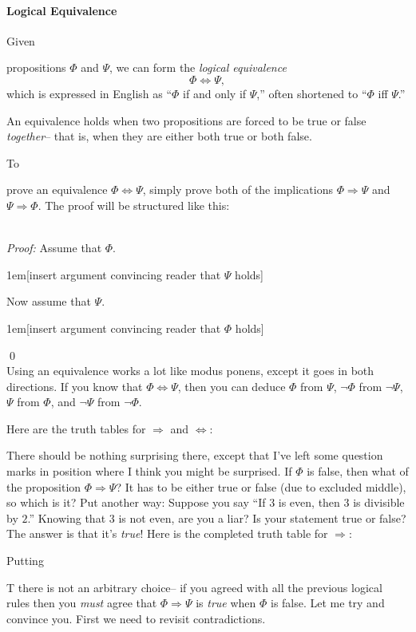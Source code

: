 \documentclass[12pt]{article}
\newcommand{\done}{\\\hspace*{0pt}\hfill$\blacksquare$}
\newcommand{\ARR}{\Rightarrow}
\newcommand{\DARR}{\Leftrightarrow}
\newcounter{rule}
\newcounter{theorem}
\newcommand{\indented}[1]{\begin{adjustwidth}{1em}{}#1\end{adjustwidth}}
\def\thmcolonspace{\hspace{1em}}
\def\proofnewline{\\[0.75em]} %
\def\done{\qed\\[0em]} %
\newcommand{\thmbox}[1]{\fbox{\parbox{\textwidth}{{#1}}}}
\newcommand{\THMMOCK}[2]{\thmbox{\textbf{Theorem:} \thmcolonspace #1} \proofnewline \textit{Proof:} #2\done}
\def\pA{\Phi}
\def\pB{\Psi}
\begin{document}
\paragraph{Logical Equivalence}
\hypertarget{hl:DARR}{Given}  propositions $\pA$ and $\pB$, we can form the \emph{logical equivalence}
$$
\pA\DARR\pB,
$$
which is expressed in English as ``$\pA$ if and only if $\pB$,'' often shortened to ``$\pA$ iff $\pB$.''

An equivalence holds when two propositions are forced to be true or false \emph{together}--
that is, when they are either both true or both false.

\hypertarget{hl:DARRPV}{To} prove an equivalence $\pA\DARR\pB$, simply prove both of the implications $\pA\ARR\pB$ and $\pB\ARR\pA$.
The proof will be structured like this:

\THMMOCK{$\pA\DARR\pB$.}{
Assume that $\pA$.
\indented{[insert argument convincing reader that $\pB$ holds]}
Now assume that $\pB$.
\indented{[insert argument convincing reader that $\pA$ holds]}
}

\hypertarget{hl:DARRUSE}{Using} an equivalence works a lot like modus ponens, except it goes in both directions.
If you know that $\pA\DARR\pB$, then you can deduce $\pA$ from $\pB$, $\neg\pA$ from $\neg\pB$,
$\pB$ from $\pA$, and $\neg\pB$ from $\neg\pA$.



\def\sp{\hspace{1em}}

Here are the truth tables for $\ARR$ and $\DARR$:
\begin{center}
\truthtablefour{$\pA\ARR\pB$}{???}{???}{F}{T}
\sp
\truthtablefour{$\pA\DARR\pB$}{T}{F}{F}{T}
\end{center}
There should be nothing surprising there, except that I've left some question marks in position where I think you might be surprised.
If $\pA$ is false, then what of the proposition $\pA\ARR\pB$?
It has to be either true or false (due to excluded middle), so which is it?
Put another way: Suppose you say ``If $3$ is even, then $3$ is divisible by $2$.''
Knowing that $3$ is not even, are you a liar? Is your statement true or false?
The answer is that it's \emph{true}!
Here is the completed truth table for $\ARR$:
\begin{center}
\truthtablefour{$\pA\ARR\pB$}{T}{T}{F}{T}
\end{center}
\hypertarget{hl:vacuous}{Putting} T there is not an arbitrary choice-- if you agreed with all the previous logical rules then you \emph{must} agree
that $\pA\ARR\pB$ is \emph{true} when $\pA$ is false.
Let me try and convince you. First we need to revisit contradictions.
\end{document}
